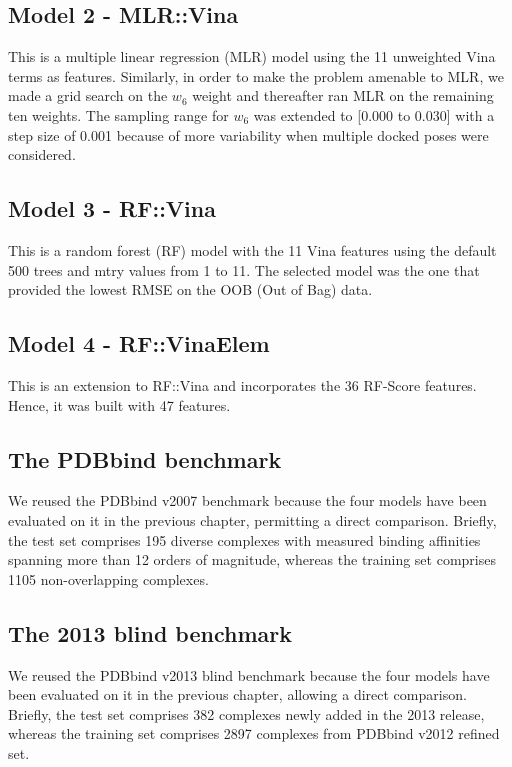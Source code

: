 \subsection{Model 2 - MLR::Vina}

This is a multiple linear regression (MLR) model using the 11 unweighted Vina terms as features. Similarly, in order to make the problem amenable to MLR, we made a grid search on the $w_6$ weight and thereafter ran MLR on the remaining ten weights. The sampling range for $w_6$ was extended to [0.000 to 0.030] with a step size of 0.001 because of more variability when multiple docked poses were considered.

\subsection{Model 3 - RF::Vina}

This is a random forest (RF) model with the 11 Vina features using the default 500 trees and mtry values from 1 to 11. The selected model was the one that provided the lowest RMSE on the OOB (Out of Bag) data.

\subsection{Model 4 - RF::VinaElem}

This is an extension to RF::Vina and incorporates the 36 RF-Score features. Hence, it was built with 47 features.

\subsection{The PDBbind benchmark}

We reused the PDBbind v2007 benchmark because the four models have been evaluated on it in the previous chapter, permitting a direct comparison. Briefly, the test set comprises 195 diverse complexes with measured binding affinities spanning more than 12 orders of magnitude, whereas the training set comprises 1105 non-overlapping complexes.

\subsection{The 2013 blind benchmark}

We reused the PDBbind v2013 blind benchmark because the four models have been evaluated on it in the previous chapter, allowing a direct comparison. Briefly, the test set comprises 382 complexes newly added in the 2013 release, whereas the training set comprises 2897 complexes from PDBbind v2012 refined set.


